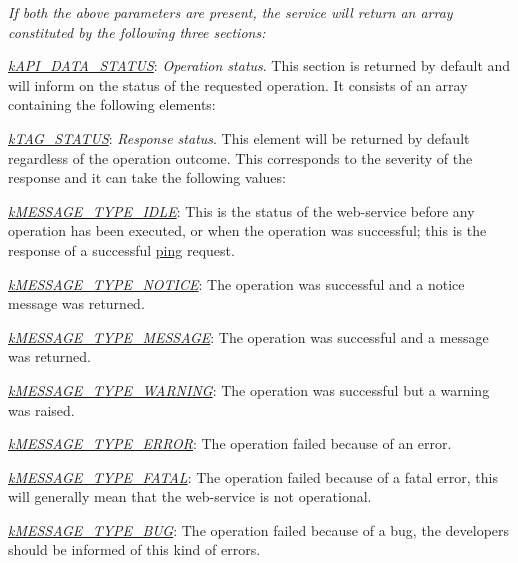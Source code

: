 {\itshape If both the above parameters are present, the service will return an array constituted by the following three sections\-:}

{\itshape 
\begin{DoxyItemize}
\item {\itshape \hyperlink{}{k\-A\-P\-I\-\_\-\-D\-A\-T\-A\-\_\-\-S\-T\-A\-T\-U\-S}}\-: {\itshape Operation status}. This section is returned by default and will inform on the status of the requested operation. It consists of an array containing the following elements\-: 
\begin{DoxyItemize}
\item {\itshape \hyperlink{}{k\-T\-A\-G\-\_\-\-S\-T\-A\-T\-U\-S}}\-: {\itshape Response status}. This element will be returned by default regardless of the operation outcome. This corresponds to the severity of the response and it can take the following values\-: 
\begin{DoxyItemize}
\item {\itshape \hyperlink{}{k\-M\-E\-S\-S\-A\-G\-E\-\_\-\-T\-Y\-P\-E\-\_\-\-I\-D\-L\-E}}\-: This is the status of the web-\/service before any operation has been executed, or when the operation was successful; this is the response of a successful \hyperlink{}{ping} request. 
\item {\itshape \hyperlink{}{k\-M\-E\-S\-S\-A\-G\-E\-\_\-\-T\-Y\-P\-E\-\_\-\-N\-O\-T\-I\-C\-E}}\-: The operation was successful and a notice message was returned. 
\item {\itshape \hyperlink{}{k\-M\-E\-S\-S\-A\-G\-E\-\_\-\-T\-Y\-P\-E\-\_\-\-M\-E\-S\-S\-A\-G\-E}}\-: The operation was successful and a message was returned. 
\item {\itshape \hyperlink{}{k\-M\-E\-S\-S\-A\-G\-E\-\_\-\-T\-Y\-P\-E\-\_\-\-W\-A\-R\-N\-I\-N\-G}}\-: The operation was successful but a warning was raised. 
\item {\itshape \hyperlink{}{k\-M\-E\-S\-S\-A\-G\-E\-\_\-\-T\-Y\-P\-E\-\_\-\-E\-R\-R\-O\-R}}\-: The operation failed because of an error. 
\item {\itshape \hyperlink{}{k\-M\-E\-S\-S\-A\-G\-E\-\_\-\-T\-Y\-P\-E\-\_\-\-F\-A\-T\-A\-L}}\-: The operation failed because of a fatal error, this will generally mean that the web-\/service is not operational. 
\item {\itshape \hyperlink{}{k\-M\-E\-S\-S\-A\-G\-E\-\_\-\-T\-Y\-P\-E\-\_\-\-B\-U\-G}}\-: The operation failed because of a bug, the developers should be informed of this kind of errors. 
\end{DoxyItemize}

\end{DoxyItemize}
\end{DoxyItemize}}
